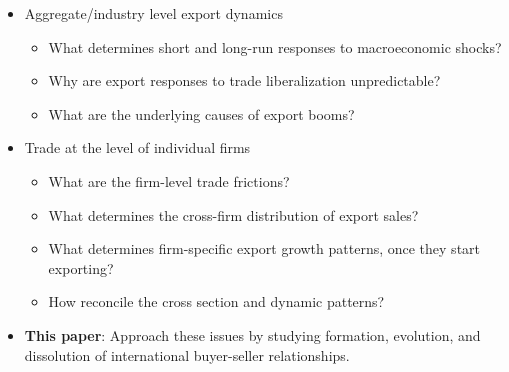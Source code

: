 \documentclass[notes=show]{beamer}
\begin{document}
\begin{frame}%


\begin{itemize}
\item Aggregate/industry level export dynamics

\begin{itemize}
\item What determines short and long-run responses to macroeconomic shocks?

\item Why are export responses to trade liberalization unpredictable?

\item What are the underlying causes of export booms?
\end{itemize}
\end{itemize}

\pause%

\begin{itemize}
\item Trade at the level of individual firms

\begin{itemize}
\item What are the firm-level trade frictions?

\item What determines the cross-firm distribution of export sales?

\item What determines firm-specific export growth patterns, once they start
exporting?

\item How reconcile the cross section and dynamic patterns?
\end{itemize}
\end{itemize}

\pause%

\begin{itemize}
\item \textbf{This paper}: Approach these issues by studying formation,
evolution, and dissolution of international buyer-seller relationships.
\end{itemize}

\end{frame}%
\end{document}

